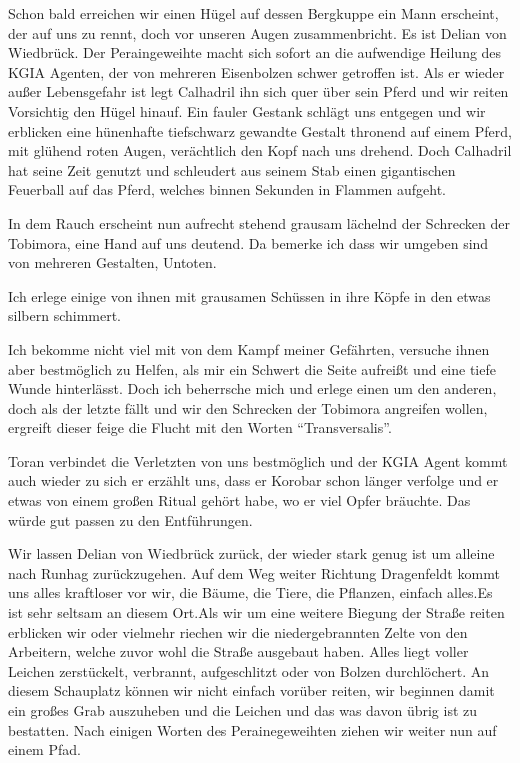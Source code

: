 Schon bald erreichen wir einen Hügel auf dessen Bergkuppe ein Mann erscheint, der auf uns zu rennt, doch vor unseren Augen zusammenbricht. Es ist Delian von Wiedbrück. Der Peraingeweihte macht sich sofort an die aufwendige Heilung des KGIA Agenten, der von mehreren Eisenbolzen schwer getroffen ist. Als er wieder außer Lebensgefahr ist legt Calhadril ihn sich quer über sein Pferd und wir reiten Vorsichtig den Hügel hinauf. Ein fauler Gestank schlägt uns entgegen und wir erblicken eine hünenhafte tiefschwarz gewandte Gestalt thronend auf einem Pferd, mit glühend roten Augen, verächtlich den Kopf nach uns drehend. Doch Calhadril hat seine Zeit genutzt und schleudert aus seinem Stab einen gigantischen Feuerball auf das Pferd, welches binnen Sekunden in Flammen aufgeht.

In dem Rauch erscheint nun aufrecht stehend grausam lächelnd der Schrecken der Tobimora, eine Hand auf uns deutend. Da bemerke ich dass wir umgeben sind von mehreren Gestalten, Untoten.

Ich erlege einige von ihnen mit grausamen Schüssen in ihre Köpfe in den etwas silbern schimmert.

Ich bekomme nicht viel mit von dem Kampf meiner Gefährten, versuche ihnen aber bestmöglich zu Helfen, als mir ein Schwert die Seite aufreißt und eine tiefe Wunde hinterlässt. Doch ich beherrsche mich und erlege einen um den anderen, doch als der letzte fällt und wir den Schrecken der Tobimora angreifen wollen, ergreift dieser feige die Flucht mit den Worten ``Transversalis''.

Toran verbindet die Verletzten von uns bestmöglich und der KGIA Agent kommt auch wieder zu sich er erzählt uns, dass er Korobar schon länger verfolge und er etwas von einem großen Ritual gehört habe, wo er viel Opfer bräuchte. Das würde gut passen zu den Entführungen.

Wir lassen Delian von Wiedbrück zurück, der wieder stark genug ist um alleine nach Runhag zurückzugehen.
Auf dem Weg weiter Richtung Dragenfeldt  kommt uns alles kraftloser vor wir, die Bäume, die Tiere, die Pflanzen, einfach alles.Es ist sehr seltsam an diesem Ort.Als wir um eine weitere Biegung der Straße reiten erblicken wir oder vielmehr riechen wir die niedergebrannten Zelte von den Arbeitern, welche zuvor wohl die Straße ausgebaut haben. Alles liegt voller Leichen zerstückelt, verbrannt, aufgeschlitzt oder von Bolzen durchlöchert. An diesem Schauplatz können wir nicht einfach vorüber reiten, wir beginnen damit ein großes Grab auszuheben und die Leichen und das was davon übrig ist zu bestatten. Nach einigen Worten des Perainegeweihten ziehen wir weiter nun auf einem Pfad.

